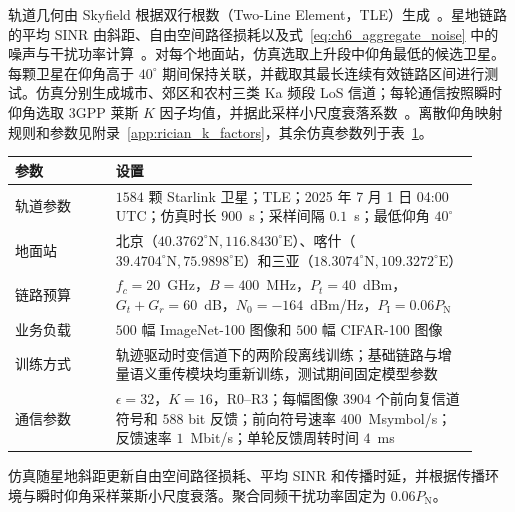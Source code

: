 轨道几何由 Skyfield 根据双行根数（Two-Line Element，TLE）生成~\cite{Rhodes-Skyfield-ASCL2019}。星地链路的平均 SINR 由斜距、自由空间路径损耗以及式~\eqref{eq:ch6_aggregate_noise} 中的噪声与干扰功率计算~\cite{ITU-R-P525}。对每个地面站，仿真选取上升段中仰角最低的候选卫星。每颗卫星在仰角高于 $40^\circ$ 期间保持关联，并截取其最长连续有效链路区间进行测试。仿真分别生成城市、郊区和农村三类 Ka 频段 LoS 信道；每轮通信按照瞬时仰角选取 3GPP 莱斯 $K$ 因子均值，并据此采样小尺度衰落系数~\cite{3gpp-38811}。离散仰角映射规则和参数见附录~\ref{app:rician_k_factors}，其余仿真参数列于表~\ref{tab:ch6_trace_config}。

\begin{table}[!htp]
    \centering
    \label{tab:ch6_trace_config}
    \small
    \renewcommand{\arraystretch}{1.12}
    \begin{tabular}{@{}p{0.20\linewidth}p{0.72\linewidth}@{}}
        \toprule
        参数 & 设置 \\
        \midrule
        轨道参数 & $1584$ 颗 Starlink 卫星；TLE；2025 年 7 月 1 日 04:00 UTC；仿真时长 $900$~s；采样间隔 $0.1$~s；最低仰角 $40^\circ$ \\
        地面站 & 北京（$40.3762^\circ\mathrm{N},116.8430^\circ\mathrm{E}$）、喀什（$39.4704^\circ\mathrm{N},75.9898^\circ\mathrm{E}$）和三亚（$18.3074^\circ\mathrm{N},109.3272^\circ\mathrm{E}$） \\
        链路预算 & $f_c=20$~GHz，$B=400$~MHz，$P_t=40$~dBm，$G_t+G_r=60$~dB，$N_0=-164$~dBm/Hz，$P_{\mathrm I}=0.06P_{\mathrm N}$ \\
        业务负载 & $500$ 幅 ImageNet-100 图像和 $500$ 幅 CIFAR-100 图像 \\
        训练方式 & 轨迹驱动时变信道下的两阶段离线训练；基础链路与增量语义重传模块均重新训练，测试期间固定模型参数 \\
        通信参数 & $\epsilon=32$，$K=16$，R0--R3；每幅图像 $3904$ 个前向复信道符号和 $588$ bit 反馈；前向符号速率 $400$~Msymbol/s；反馈速率 $1$~Mbit/s；单轮反馈周转时间 $4$~ms \\
        \bottomrule
    \end{tabular}
\end{table}

仿真随星地斜距更新自由空间路径损耗、平均 SINR 和传播时延，并根据传播环境与瞬时仰角采样莱斯小尺度衰落。聚合同频干扰功率固定为 $0.06P_{\mathrm N}$。

